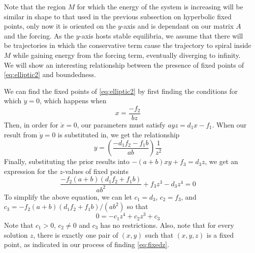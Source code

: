 \documentclass[11pt]{article}
\begin{document}
Note that the region $M$ for which the energy of the system is increasing will be similar in shape to that used in the previous subsection on hyperbolic fixed points, only now it is oriented on the $y$-axis and is dependant on our matrix $A$ and the forcing. As the $y$-axis hosts stable equilibria, we assume that there will be trajectories in which the conservative term cause the trajectory to spiral inside $M$ while gaining energy from the forcing term, eventually diverging to infinity. We will show an interesting relationship between the presence of fixed points of \eqref{eq:elliptic2} and boundedness. 

We can find the fixed points of \eqref{eq:elliptic2} by first finding the conditions for which $\dot{y} = 0$, which happens when $$x = \frac{-f_2}{bz}$$Then, in order for $\dot{x} = 0$, our parameters must satisfy $ayz = d_1x - f_1$. When our result from $\dot{y} = 0$ is substituted in, we get the relationship $$y = \left(\frac{-d_1f_2 - f_1b}{ab} \right)\frac{1}{z^2}$$Finally, substituting the prior results into $-(a + b)xy + f_3 = d_3z$, we get an expression for the $z$-values of fixed points
\begin{equation}\label{eq:fixedz}
    \frac{-f_2(a + b)(d_1f_2 + f_1b)}{ab^2} + f_3z^3 - d_3z^4  = 0
\end{equation}
To simplify the above equation, we can let $c_1 = d_3$, $c_2 = f_3$, and $c_3 = -f_2(a + b)(d_1f_2 + f_1b)/(ab^2)$ so that $$0 = -c_1z^4 + c_2z^3 + c_3$$Note that $c_1>0$, $c_2 \neq 0$ and $c_3$ has no restrictions. Also, note that for every solution $z$, there is exactly one pair of $(x,y)$ such that $(x,y,z)$ is a fixed point, as indicated in our process of finding \eqref{eq:fixedz}.
\end{document}
